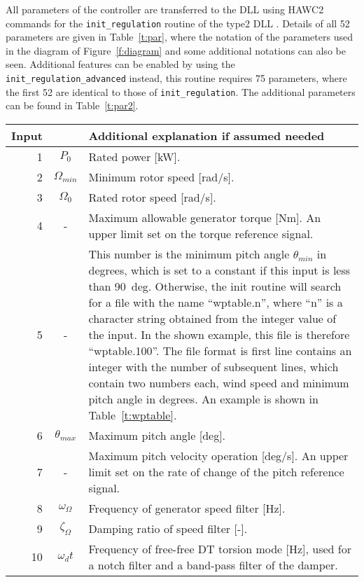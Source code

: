 All parameters of the controller are transferred to the DLL using HAWC2 commands for the \verb|init_regulation| routine of the type2 DLL \cite{Larsen12}. Details of all 52 parameters are given in Table~\ref{t:par}, where the notation of the parameters used in the diagram of Figure~\ref{f:diagram} and some additional notations can also be seen. Additional features can be enabled by using the \verb|init_regulation_advanced| instead, this routine requires 75 parameters, where the first 52 are identical to those of \verb|init_regulation|. The additional parameters can be found in Table~\ref{t:par2}.

\begin{table}[!htbp]
\begin{center}
\begin{tabular}{r|c|p{11.5cm}}
Input &  & Additional explanation if assumed needed \\ \hline
1 & $P_0$ 			& Rated power [kW].\\
2 & $\Omega_{min}$	& Minimum rotor speed [rad/s].\\
3 & $\Omega_0$ 		& Rated rotor speed [rad/s]. \\
4 & - 				& Maximum allowable generator torque [Nm]. An upper limit set on the torque reference signal. \\
5 & - 				& This number is the minimum pitch angle $\theta_{min}$ in degrees, which is set to a constant if this input is less than 90~deg. Otherwise, the init routine will search for a file with the name ``wptable.n'', where ``n'' is a character string obtained from the integer value of the input. In the shown example, this file is therefore ``wptable.100''. The file format is first line contains an integer with the number of subsequent lines, which contain two numbers each, wind speed and minimum pitch angle in degrees. An example is shown in Table~\ref{t:wptable}.\\
6 & $\theta_{max}$	& Maximum pitch angle [deg]. \\
7 & - 				& Maximum pitch velocity operation [deg/s]. An upper limit set on the rate of change of the pitch reference signal.\\
\hline
8 & $\omega_{\Omega}$ 	& Frequency of generator speed filter [Hz]. \\
9 & $\zeta_{\Omega}$ 	& Damping ratio of speed filter [-]. \\
10 & $\omega_dt$ 		& Frequency of free-free DT torsion mode [Hz], used for a notch filter and a band-pass filter of the damper. \\

\end{tabular}
\end{center}
\end{table}
